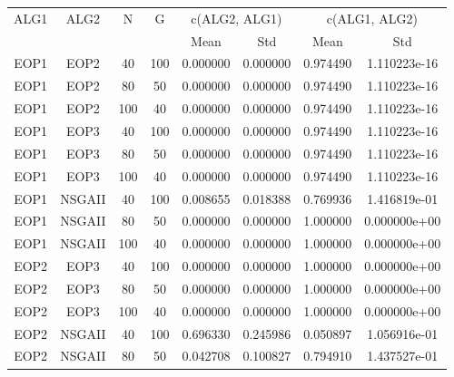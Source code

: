 \begin{table}[H]
\centering
\renewcommand{\arraystretch}{1.5}
\begin{tabular}{cccccccc}
\toprule
 \multirow{2}{*}{ALG1} &    \multirow{2}{*}{ALG2} &    \multirow{2}{*}{N} &    \multirow{2}{*}{G} &  \multicolumn{2}{c}{c(ALG2, ALG1)} &  \multicolumn{2}{c}{c(ALG1, ALG2)} \\ \cline{5-6} \cline{7-8}
   &   &   &   &  Mean &  Std &  Mean &  Std \\
\midrule
 EOP1 &    EOP2 &   40 &  100 &            0.000000 &           0.000000 &            0.974490 &       1.110223e-16 \\
 EOP1 &    EOP2 &   80 &   50 &            0.000000 &           0.000000 &            0.974490 &       1.110223e-16 \\
 EOP1 &    EOP2 &  100 &   40 &            0.000000 &           0.000000 &            0.974490 &       1.110223e-16 \\
 EOP1 &    EOP3 &   40 &  100 &            0.000000 &           0.000000 &            0.974490 &       1.110223e-16 \\
 EOP1 &    EOP3 &   80 &   50 &            0.000000 &           0.000000 &            0.974490 &       1.110223e-16 \\
 EOP1 &    EOP3 &  100 &   40 &            0.000000 &           0.000000 &            0.974490 &       1.110223e-16 \\
 EOP1 &  NSGAII &   40 &  100 &            0.008655 &           0.018388 &            0.769936 &       1.416819e-01 \\
 EOP1 &  NSGAII &   80 &   50 &            0.000000 &           0.000000 &            1.000000 &       0.000000e+00 \\
 EOP1 &  NSGAII &  100 &   40 &            0.000000 &           0.000000 &            1.000000 &       0.000000e+00 \\
 EOP2 &    EOP3 &   40 &  100 &            0.000000 &           0.000000 &            1.000000 &       0.000000e+00 \\
 EOP2 &    EOP3 &   80 &   50 &            0.000000 &           0.000000 &            1.000000 &       0.000000e+00 \\
 EOP2 &    EOP3 &  100 &   40 &            0.000000 &           0.000000 &            1.000000 &       0.000000e+00 \\
 EOP2 &  NSGAII &   40 &  100 &            0.696330 &           0.245986 &            0.050897 &       1.056916e-01 \\
 EOP2 &  NSGAII &   80 &   50 &            0.042708 &           0.100827 &            0.794910 &       1.437527e-01 \\

\end{tabular}
\end{table}
